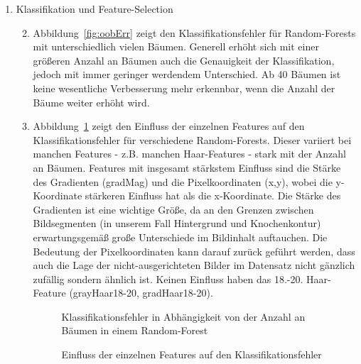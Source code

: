 \documentclass[]{report}
\newlength\figureheight
\newlength\figurewidth
\begin{document}
\begin{enumerate}
			
		\item Klassifikation und Feature-Selection
			\begin{enumerate}
				\setcounter{enumii}{1}
				\item Abbildung~\ref{fig:oobErr} zeigt den Klassifikationsfehler für Random-Forests mit unterschiedlich vielen Bäumen. Generell erhöht sich mit einer größeren Anzahl an Bäumen auch die Genauigkeit der Klassifikation, jedoch mit immer geringer werdendem Unterschied. Ab 40 Bäumen ist keine wesentliche Verbesserung mehr erkennbar, wenn die Anzahl der Bäume weiter erhöht wird.
				\item Abbildung~\ref{fig:oobVar} zeigt den Einfluss der einzelnen Features auf den Klassifikationsfehler für verschiedene Random-Forests. Dieser variiert bei manchen Features - z.B. manchen Haar-Features - stark mit der Anzahl an Bäumen. Features mit insgesamt stärkstem Einfluss sind die Stärke des Gradienten (gradMag) und die Pixelkoordinaten (x,y), wobei die y-Koordinate stärkeren Einfluss hat als die x-Koordinate. Die Stärke des Gradienten ist eine wichtige Größe, da an den Grenzen zwischen Bildsegmenten (in unserem Fall Hintergrund und Knochenkontur) erwartungsgemäß große Unterschiede im Bildinhalt auftauchen. Die Bedeutung der Pixelkoordinaten kann darauf zurück geführt werden, dass auch die Lage der nicht-ausgerichteten Bilder im Datensatz nicht gänzlich zufällig sondern ähnlich ist. Keinen Einfluss haben das 18.-20. Haar-Feature (grayHaar18-20, gradHaar18-20).
			\setlength\figureheight{3.5cm}
			\setlength{}
				\begin{figure}
					\centering
					
					\caption{Klassifikationsfehler in Abhängigkeit von der Anzahl an Bäumen in einem Random-Forest}
					\label{fig:oobErr}
					\caption{Einfluss der einzelnen Features auf den Klassifikationsfehler}
					\label{fig:oobVar}
				\end{figure}
			\end{enumerate}
			

\end{enumerate}
\end{document}

